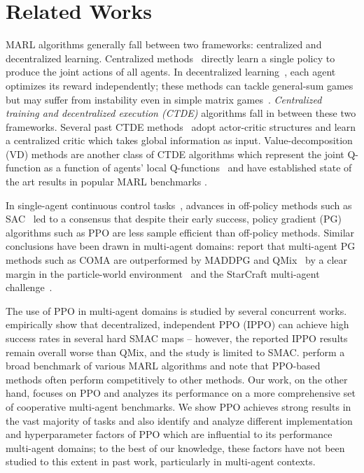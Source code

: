 \documentclass{article}
\theoremstyle{plain}
\theoremstyle{definition}
\theoremstyle{remark}
\begin{document}
\section{Related Works} \label{Sec: related} 
\vspace{-3mm}
MARL algorithms generally fall between two frameworks: centralized and decentralized learning. Centralized methods~\cite{claus1998dynamics} directly learn a single policy to produce the joint actions of all agents. In decentralized learning~\cite{littman1994markov}, each agent optimizes its reward independently; these methods can tackle general-sum games but may suffer from instability even in simple matrix games~\cite{foerster2017learning}. \emph{Centralized training and decentralized execution (CTDE)} algorithms fall in between these two frameworks. Several past CTDE methods~\cite{lowe2017multi, foerster2017counterfactual} adopt actor-critic structures and learn a centralized critic which takes global information as input. Value-decomposition (VD) methods are another class of CTDE algorithms which represent the joint Q-function as a function of agents' local Q-functions~\cite{sunehag2018value, pmlr-v80-rashid18a, son2019qtran}
and have established state of the art results in popular MARL benchmarks \cite{wang2021rode, wang2021qplex}. 


In single-agent continuous control tasks~\cite{duan2016benchmarking}, advances in off-policy methods such as SAC~\cite{haarnoja2018soft} led to a consensus that despite their early success, policy gradient (PG) algorithms such as PPO are less sample efficient than off-policy methods.
Similar conclusions have been drawn in multi-agent domains: \cite{papoudakis2021benchmarking} report that multi-agent PG methods such as COMA are outperformed by MADDPG and QMix~\cite{pmlr-v80-rashid18a} by a clear margin in the particle-world environment~\cite{mordatch2017emergence} and the StarCraft multi-agent challenge~\cite{starcraft}.


The use of PPO in multi-agent domains is studied by several concurrent works. \cite{dewitt2020independent} empirically show that decentralized, independent PPO (IPPO) can achieve high success rates in several hard SMAC maps -- however, the reported IPPO results remain overall worse than QMix, and the study is limited to SMAC. \cite{papoudakis2021benchmarking} perform a broad benchmark of various MARL algorithms and note that PPO-based methods often perform competitively to other methods. Our work, on the other hand, focuses on PPO and analyzes its performance on a more comprehensive set of cooperative multi-agent benchmarks. We show PPO achieves strong results in the vast majority of tasks and also identify and analyze different implementation and hyperparameter factors of PPO which are influential to its performance multi-agent domains; to the best of our knowledge, these factors have not been studied to this extent in past work, particularly in multi-agent contexts.
\end{document}

